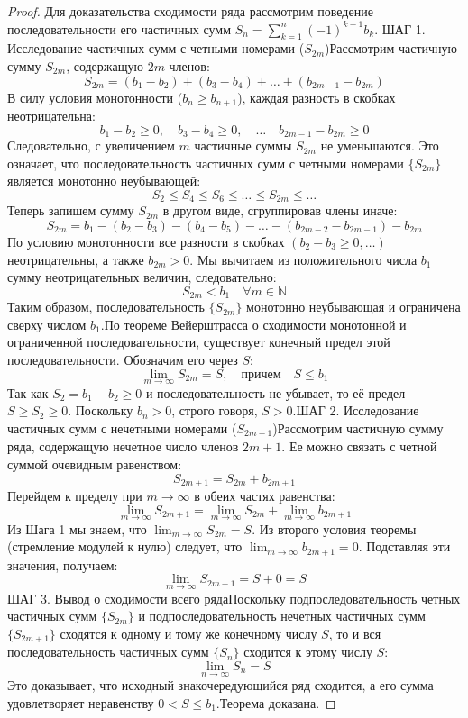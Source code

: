 \documentclass[14pt]{extreport}
\begin{document}
    \begin{proof}
        Для доказательства сходимости ряда рассмотрим поведение последовательности его частичных сумм $S_n = \sum_{k=1}^n (-1)^{k-1} b_k$.
        ШАГ 1. Исследование частичных сумм с четными номерами ($S_{2m}$)Рассмотрим частичную сумму $S_{2m}$, содержащую $2m$ членов:$$S_{2m} = (b_1 - b_2) + (b_3 - b_4) + \dots + (b_{2m-1} - b_{2m})$$В силу условия монотонности ($b_n \ge b_{n+1}$), каждая разность в скобках неотрицательна:$$b_1 - b_2 \ge 0, \quad b_3 - b_4 \ge 0, \quad \dots \quad b_{2m-1} - b_{2m} \ge 0$$Следовательно, с увеличением $m$ частичные суммы $S_{2m}$ не уменьшаются. Это означает, что последовательность частичных сумм с четными номерами $\{S_{2m}\}$ является монотонно неубывающей:$$S_2 \le S_4 \le S_6 \le \dots \le S_{2m} \le \dots$$Теперь запишем сумму $S_{2m}$ в другом виде, сгруппировав члены иначе:$$S_{2m} = b_1 - (b_2 - b_3) - (b_4 - b_5) - \dots - (b_{2m-2} - b_{2m-1}) - b_{2m}$$По условию монотонности все разности в скобках $(b_2 - b_3 \ge 0, \dots)$ неотрицательны, а также $b_{2m} > 0$. Мы вычитаем из положительного числа $b_1$ сумму неотрицательных величин, следовательно:$$S_{2m} < b_1 \quad \forall m \in \mathbb{N}$$Таким образом, последовательность $\{S_{2m}\}$ монотонно неубывающая и ограничена сверху числом $b_1$.По теореме Вейерштрасса о сходимости монотонной и ограниченной последовательности, существует конечный предел этой последовательности. Обозначим его через $S$:$$\lim_{m \to \infty} S_{2m} = S, \quad \text{причем} \quad S \le b_1$$Так как $S_{2} = b_1 - b_2 \ge 0$ и последовательность не убывает, то её предел $S \ge S_2 \ge 0$. Поскольку $b_n > 0$, строго говоря, $S > 0$.ШАГ 2. Исследование частичных сумм с нечетными номерами ($S_{2m+1}$)Рассмотрим частичную сумму ряда, содержащую нечетное число членов $2m+1$. Ее можно связать с четной суммой очевидным равенством:$$S_{2m+1} = S_{2m} + b_{2m+1}$$Перейдем к пределу при $m \to \infty$ в обеих частях равенства:$$\lim_{m \to \infty} S_{2m+1} = \lim_{m \to \infty} S_{2m} + \lim_{m \to \infty} b_{2m+1}$$Из Шага 1 мы знаем, что $\lim_{m \to \infty} S_{2m} = S$. Из второго условия теоремы (стремление модулей к нулю) следует, что $\lim_{m \to \infty} b_{2m+1} = 0$. Подставляя эти значения, получаем:$$\lim_{m \to \infty} S_{2m+1} = S + 0 = S$$ШАГ 3. Вывод о сходимости всего рядаПоскольку подпоследовательность четных частичных сумм $\{S_{2m}\}$ и подпоследовательность нечетных частичных сумм $\{S_{2m+1}\}$ сходятся к одному и тому же конечному числу $S$, то и вся последовательность частичных сумм $\{S_n\}$ сходится к этому числу $S$:$$\lim_{n \to \infty} S_n = S$$Это доказывает, что исходный знакочередующийся ряд сходится, а его сумма удовлетворяет неравенству $0 < S \le b_1$.Теорема доказана.
    \end{proof}
\end{document}
